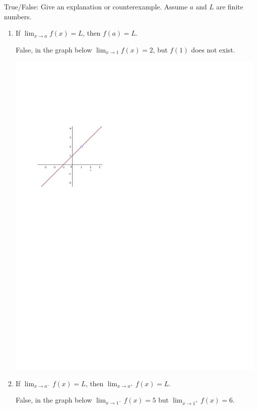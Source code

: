 \documentclass[handout,nooutcomes]{ximera}
\begin{document}
	
	
	
	
\begin{problem}
True/False:  Give an explanation or counterexample.  Assume $a$ and $L$ are finite numbers.
	
			\begin{enumerate}
			
			\item  If $ \lim_{x \to a} f(x) = L$, then $f(a) = L$.
			\begin{freeResponse}
			False, in the graph below $ \lim_{x \to 1} f(x) = 2 $, but $f(1)$ does not exist.
			
				\begin{image}
				\includegraphics[trim= 70 470 250 160]{Figure5.pdf}
				\end{image}
			\end{freeResponse}
			
			
			
			\item  If $  \lim_{x \to a^-} f(x) = L$, then $  \lim_{x \to a^+} f(x) = L $.
			\begin{freeResponse}
			False, in the graph below $ \lim_{x \to 1^-} f(x) = 5$ but $ \lim_{x \to 1^+} f(x) = 6$.
			

\end{freeResponse}
\end{enumerate}
\end{problem}
\end{document}
